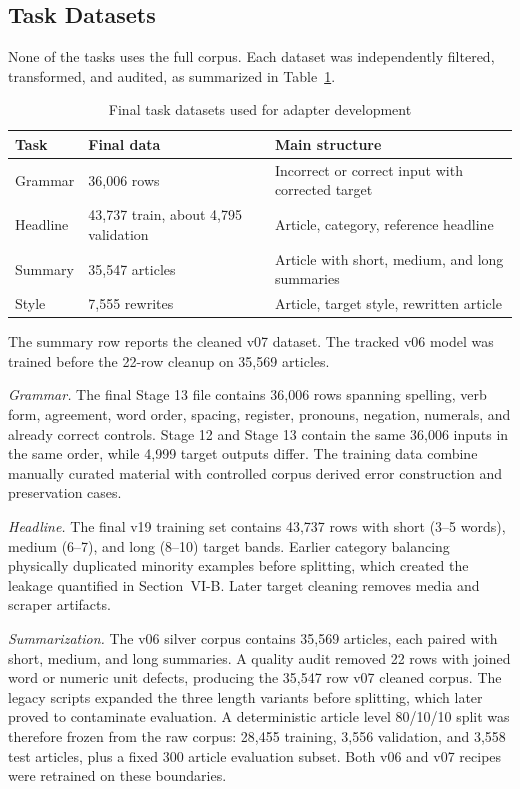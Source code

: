 \documentclass[a4paper,conference]{IEEEtran}
\begin{document}
\subsection{Task Datasets}
None of the tasks uses the full corpus. Each dataset was independently filtered,
transformed, and audited, as summarized in Table~\ref{tab:datasets}.

\begin{table}[!b]
\caption{Final task datasets used for adapter development}
\label{tab:datasets}
\centering
\footnotesize
\setlength{\tabcolsep}{2.6pt}
\renewcommand{\arraystretch}{1.05}
\begin{tabular}{|p{}|p{}|p{}|}
\hline
\textbf{Task} & \textbf{Final data} & \textbf{Main structure} \\
\hline
Grammar & 36,006 rows & Incorrect or correct input with corrected target \\
\hline
Headline & 43,737 train, about 4,795 validation & Article, category, reference headline \\
\hline
Summary & 35,547 articles & Article with short, medium, and long summaries \\
\hline
Style & 7,555 rewrites & Article, target style, rewritten article \\
\hline
\end{tabular}
\end{table}

The summary row reports the cleaned v07 dataset. The tracked v06 model was
trained before the 22-row cleanup on 35,569 articles.

\textit{Grammar.} The final Stage 13 file contains 36,006 rows spanning
spelling, verb form, agreement, word order, spacing, register, pronouns,
negation, numerals, and already correct controls. Stage 12 and Stage 13 contain
the same 36,006 inputs in the same order, while 4,999 target outputs differ.
The training data combine manually curated material with controlled
corpus derived error construction and preservation cases.

\textit{Headline.} The final v19 training set contains 43,737 rows with short
(3--5 words), medium (6--7), and long (8--10) target bands. Earlier category
balancing physically duplicated minority examples before splitting, which
created the leakage quantified in Section~VI-B. Later target cleaning removes
media and scraper artifacts.

\textit{Summarization.} The v06 silver corpus contains 35,569
articles, each paired with short, medium, and long summaries. A quality audit
removed 22 rows with joined word or numeric unit defects, producing the 35,547 row
v07 cleaned corpus. The legacy scripts expanded the three length variants
before splitting, which later proved to contaminate evaluation. A deterministic
article level 80/10/10 split was therefore frozen from the raw corpus: 28,455
training, 3,556 validation, and 3,558 test articles, plus a fixed 300 article
evaluation subset. Both v06 and v07 recipes were retrained on these boundaries.
\end{document}
